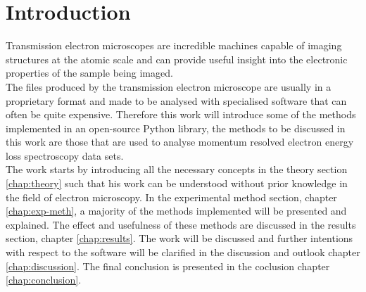 \section{Introduction}
Transmission electron microscopes are incredible machines capable of imaging structures at the atomic scale and can provide useful insight into the electronic properties of the sample being imaged.\\
The files produced by the transmission electron microscope are usually in a proprietary format and made to be analysed with specialised software that can often be quite expensive. Therefore this work will introduce some of the methods implemented in an open-source Python library, the methods to be discussed in this work are those that are used to analyse momentum resolved electron energy loss spectroscopy data sets.\\
The work starts by introducing all the necessary concepts in the theory section \ref{chap:theory} such that his work can be understood without prior knowledge in the field of electron microscopy. In the experimental method section, chapter \ref{chap:exp-meth}, a majority of the methods implemented will be presented and explained. The effect and usefulness of these methods are discussed in the results section, chapter \ref{chap:results}. The work will be discussed and further intentions with respect to the software will be clarified in the discussion and outlook chapter \ref{chap:discussion}. The final conclusion is presented in the coclusion chapter \ref{chap:conclusion}.





